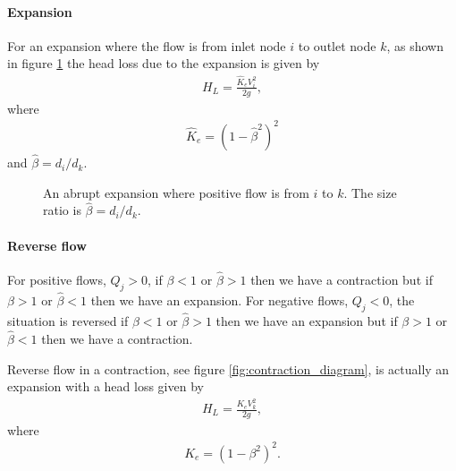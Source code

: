 \paragraph{Expansion}

For an expansion where the flow is from inlet node $i$ to outlet node $k$, as shown in figure \ref{fig:expansion_diagram} the head loss due to the expansion \cite{rennels22} is given by
\begin{align}
H_L = \frac{\hat{K}_e V_i^2}{2g},
\end{align}
where
\begin{align*}
\hat{K}_e = \left(1 - \hat{\beta}^2 \right)^2
\end{align*}
and $\hat{\beta} =  d_i / d_k$.

\begin{figure}
\centering
{} 
\caption{An abrupt expansion where positive flow is from $i$ to $k$. The size ratio is $\hat{\beta} = d_i / d_k$.}
\label{fig:expansion_diagram}
\end{figure}

\paragraph{Reverse flow}

For positive flows, $Q_j > 0$, if $\beta < 1$ or $\hat{\beta} > 1$ then we have a contraction but if $\beta > 1$ or $\hat{\beta} < 1$ then we have an expansion. For negative flows, $Q_j < 0$, the situation is reversed if $\beta < 1$ or $\hat{\beta} > 1$ then we have an expansion but if $\beta > 1$ or $\hat{\beta} < 1$ then we have a contraction.

Reverse flow in a contraction, see figure \ref{fig:contraction_diagram}, is actually an expansion with a head loss given by
\begin{align}
H_L = \frac{K_e V_k^2}{2g},
\end{align}
where
\begin{align*}
K_e = \left(1 - \beta^2 \right)^2.
\end{align*}

